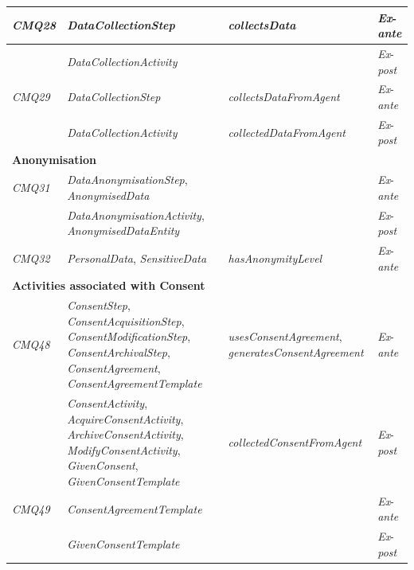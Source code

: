 \begin{center}
\begin{tabularx}{\textwidth}{|l|X|p{5cm}|l|}
\textit{CMQ28} & \textit{DataCollectionStep} & \textit{collectsData} & \textit{Ex}-\textit{ante} \\ \hline
 & \textit{DataCollectionActivity} &  & \textit{Ex}-\textit{post} \\ \hline
\textit{CMQ29} & \textit{DataCollectionStep} & \textit{collectsDataFromAgent} & \textit{Ex}-\textit{ante} \\ \hline
 & \textit{DataCollectionActivity} & \textit{collectedDataFromAgent} & \textit{Ex}-\textit{post} \\ \hline
\multicolumn{4}{|l|}{\textbf{Anonymisation}} \\ \hline
\textit{CMQ31} & \textit{DataAnonymisationStep}, \textit{AnonymisedData} &  & \textit{Ex}-\textit{ante} \\ \hline
 & \textit{DataAnonymisationActivity}, \textit{AnonymisedDataEntity} &  & \textit{Ex}-\textit{post} \\ \hline
\textit{CMQ32} & \textit{PersonalData}, \textit{SensitiveData} & \textit{hasAnonymityLevel} & \textit{Ex}-\textit{ante} \\ \hline
\multicolumn{4}{|l|}{\textbf{Activities associated with Consent}} \\ \hline
\textit{CMQ48} & \textit{ConsentStep}, \textit{ConsentAcquisitionStep}, \textit{ConsentModificationStep}, \textit{ConsentArchivalStep}, \textit{ConsentAgreement}, \textit{ConsentAgreementTemplate} & \textit{usesConsentAgreement}, \textit{generatesConsentAgreement} & \textit{Ex}-\textit{ante} \\ \hline
 & \textit{ConsentActivity}, \textit{AcquireConsentActivity}, \textit{ArchiveConsentActivity}, \textit{ModifyConsentActivity}, \textit{GivenConsent}, \textit{GivenConsentTemplate} & \textit{collectedConsentFromAgent} & \textit{Ex}-\textit{post} \\ \hline
\textit{CMQ49} & \textit{ConsentAgreementTemplate} &  & \textit{Ex}-\textit{ante} \\ \hline
 & \textit{GivenConsentTemplate} &  & \textit{Ex}-\textit{post} \\
\bottomrule
\end{tabularx}
\end{center}

